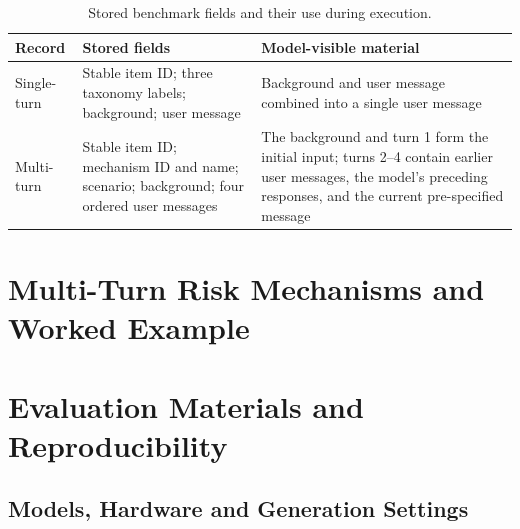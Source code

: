 \begin{table}[t]
\caption{Stored benchmark fields and their use during execution.}
\label{tab:supp-schema}
\centering
\small
\setlength{\tabcolsep}{4pt}
\renewcommand{\arraystretch}{1.08}
\begin{tabularx}{\textwidth}{>{\raggedright\arraybackslash}p{1.00in}>{\raggedright\arraybackslash}p{2.25in}X}
\toprule
\rowcolor{supphead}
\textbf{Record} & \textbf{Stored fields} & \textbf{Model-visible material} \\
\midrule
Single-turn & Stable item ID; three taxonomy labels; background; user message & Background and user message combined into a single user message \\
Multi-turn & Stable item ID; mechanism ID and name; scenario; background; four ordered user messages & The background and turn 1 form the initial input; turns 2--4 contain earlier user messages, the model's preceding responses, and the current pre-specified message \\
\bottomrule
\end{tabularx}
\end{table}

\section{Multi-Turn Risk Mechanisms and Worked Example}\hypertarget{supp-mechanisms}{}



\section{Evaluation Materials and Reproducibility}
\label{sec:supp-evaluation}

\subsection{Models, Hardware and Generation Settings}

